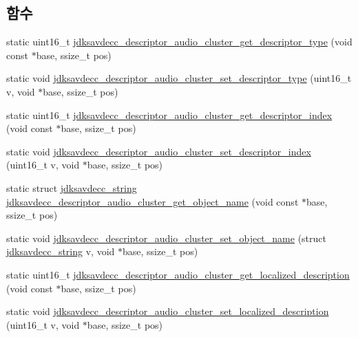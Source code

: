 \subsection*{함수}
\begin{DoxyCompactItemize}
\item 
static uint16\+\_\+t \hyperlink{group__descriptor__audio__cluster_ga161ef88a3a0096712e7ae2c7785c68c4}{jdksavdecc\+\_\+descriptor\+\_\+audio\+\_\+cluster\+\_\+get\+\_\+descriptor\+\_\+type} (void const $\ast$base, ssize\+\_\+t pos)
\item 
static void \hyperlink{group__descriptor__audio__cluster_ga7440503255105151f25aaa46ad30ca37}{jdksavdecc\+\_\+descriptor\+\_\+audio\+\_\+cluster\+\_\+set\+\_\+descriptor\+\_\+type} (uint16\+\_\+t v, void $\ast$base, ssize\+\_\+t pos)
\item 
static uint16\+\_\+t \hyperlink{group__descriptor__audio__cluster_gac54877ae34c9b9eadb80dd19e0ee1d57}{jdksavdecc\+\_\+descriptor\+\_\+audio\+\_\+cluster\+\_\+get\+\_\+descriptor\+\_\+index} (void const $\ast$base, ssize\+\_\+t pos)
\item 
static void \hyperlink{group__descriptor__audio__cluster_ga938162e692528b6c567f975cf98b7642}{jdksavdecc\+\_\+descriptor\+\_\+audio\+\_\+cluster\+\_\+set\+\_\+descriptor\+\_\+index} (uint16\+\_\+t v, void $\ast$base, ssize\+\_\+t pos)
\item 
static struct \hyperlink{structjdksavdecc__string}{jdksavdecc\+\_\+string} \hyperlink{group__descriptor__audio__cluster_ga5292c49cab71af6d076e8eecfdb892cf}{jdksavdecc\+\_\+descriptor\+\_\+audio\+\_\+cluster\+\_\+get\+\_\+object\+\_\+name} (void const $\ast$base, ssize\+\_\+t pos)
\item 
static void \hyperlink{group__descriptor__audio__cluster_ga9e1502fdbb3064c322bc04f2e76727dd}{jdksavdecc\+\_\+descriptor\+\_\+audio\+\_\+cluster\+\_\+set\+\_\+object\+\_\+name} (struct \hyperlink{structjdksavdecc__string}{jdksavdecc\+\_\+string} v, void $\ast$base, ssize\+\_\+t pos)
\item 
static uint16\+\_\+t \hyperlink{group__descriptor__audio__cluster_gaa9858a53010cd564ac25a9a31f232496}{jdksavdecc\+\_\+descriptor\+\_\+audio\+\_\+cluster\+\_\+get\+\_\+localized\+\_\+description} (void const $\ast$base, ssize\+\_\+t pos)
\item 
static void \hyperlink{group__descriptor__audio__cluster_gac680afaa0fe692c74daa944e57c5c53b}{jdksavdecc\+\_\+descriptor\+\_\+audio\+\_\+cluster\+\_\+set\+\_\+localized\+\_\+description} (uint16\+\_\+t v, void $\ast$base, ssize\+\_\+t pos)
\item 

\end{DoxyCompactItemize}
